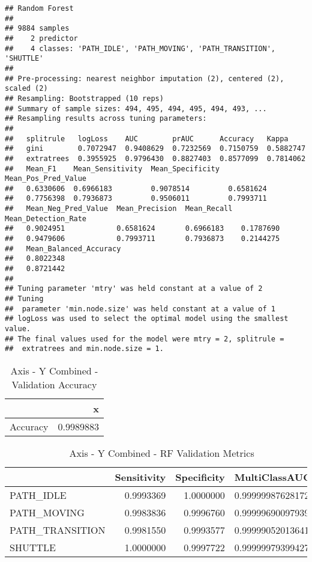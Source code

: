 \documentclass[]{article}
\begin{document}
\begin{verbatim}
## Random Forest 
## 
## 9884 samples
##    2 predictor
##    4 classes: 'PATH_IDLE', 'PATH_MOVING', 'PATH_TRANSITION', 'SHUTTLE' 
## 
## Pre-processing: nearest neighbor imputation (2), centered (2), scaled (2) 
## Resampling: Bootstrapped (10 reps) 
## Summary of sample sizes: 494, 495, 494, 495, 494, 493, ... 
## Resampling results across tuning parameters:
## 
##   splitrule   logLoss    AUC        prAUC      Accuracy   Kappa    
##   gini        0.7072947  0.9408629  0.7232569  0.7150759  0.5882747
##   extratrees  0.3955925  0.9796430  0.8827403  0.8577099  0.7814062
##   Mean_F1    Mean_Sensitivity  Mean_Specificity  Mean_Pos_Pred_Value
##   0.6330606  0.6966183         0.9078514         0.6581624          
##   0.7756398  0.7936873         0.9506011         0.7993711          
##   Mean_Neg_Pred_Value  Mean_Precision  Mean_Recall  Mean_Detection_Rate
##   0.9024951            0.6581624       0.6966183    0.1787690          
##   0.9479606            0.7993711       0.7936873    0.2144275          
##   Mean_Balanced_Accuracy
##   0.8022348             
##   0.8721442             
## 
## Tuning parameter 'mtry' was held constant at a value of 2
## Tuning
##  parameter 'min.node.size' was held constant at a value of 1
## logLoss was used to select the optimal model using the smallest value.
## The final values used for the model were mtry = 2, splitrule =
##  extratrees and min.node.size = 1.
\end{verbatim}

\begin{table}[!h]

\caption{\label{tab:sensor-y-combined-rf-results}Axis - Y Combined - Validation Accuracy}
\centering
\begin{tabular}[t]{lr}
\toprule
  & x\\
\midrule
Accuracy & 0.9989883\\
\bottomrule
\end{tabular}
\end{table}

\begin{table}[!h]

\caption{\label{tab:sensor-y-combined-rf-results}Axis - Y Combined - RF Validation Metrics}
\centering
\begin{tabular}[t]{lrrl}
\toprule
  & Sensitivity & Specificity & MultiClassAUC\\
\midrule
PATH\_IDLE & 0.9993369 & 1.0000000 & 0.999999876281721\\
PATH\_MOVING & 0.9983836 & 0.9996760 & 0.999996900979395\\
PATH\_TRANSITION & 0.9981550 & 0.9993577 & 0.999990520136415\\
SHUTTLE & 1.0000000 & 0.9997722 & 0.999999793994274\\
\bottomrule
\end{tabular}
\end{table}
\end{document}
